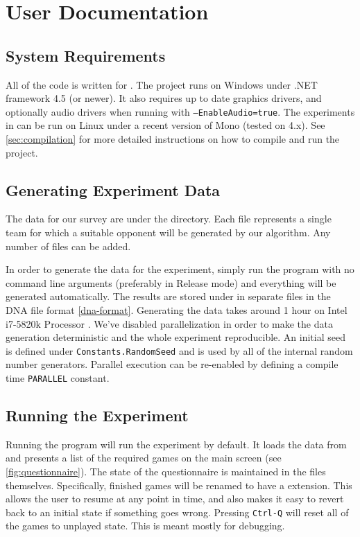 \chapter{User Documentation}

\section{System Requirements}

All of the code is written for . The  project runs on Windows under .NET framework 4.5 (or newer). It also requires up to date graphics drivers, and optionally audio drivers when running with \texttt{--EnableAudio=true}. The experiments in  can be run on Linux under a recent version of Mono (tested on 4.x). See \autoref{sec:compilation} for more detailed instructions on how to compile and run the project.

\section{Generating Experiment Data}

The data for our survey are under the  directory. Each file represents a single team for which a suitable opponent will be generated by our algorithm. Any number of files can be added.

In order to generate the data for the experiment, simply run the  program with no command line arguments (preferably in Release mode) and everything will be generated automatically. The results are stored under  in separate files in the DNA file format \autoref{dna-format}. Generating the data takes around 1 hour on Intel i7-5820k Processor \citep{intel-ark}. We've disabled parallelization in order to make the data generation deterministic and the whole experiment reproducible. An initial seed is defined under \verb|Constants.RandomSeed| and is used by all of the internal random number generators. Parallel execution can be re-enabled by defining a compile time \verb|PARALLEL| constant.

\section{Running the Experiment}

Running the  program will run the experiment by default. It loads the data from  and presents a list of the required games on the main screen (see \autoref{fig:questionnaire}). The state of the questionnaire is maintained in the files themselves. Specifically, finished games will be renamed to have a  extension. This allows the user to resume at any point in time, and also makes it easy to revert back to an initial state if something goes wrong. Pressing \verb|Ctrl-Q| will reset all of the games to unplayed state. This is meant mostly for debugging.

